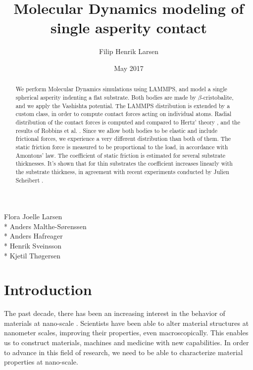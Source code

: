 \documentclass[twoside,english]{uiofysmaster}
\author{Filip Henrik Larsen}
\title{Molecular Dynamics modeling of single asperity contact}
\date{May 2017}
\begin{document}
\maketitle

\begin{abstract}
We perform Molecular Dynamics simulations using LAMMPS, and model a single spherical asperity indenting a flat substrate.
Both bodies are made by $\beta$-cristobalite, and we apply the Vashishta potential.
The LAMMPS distribution is extended by a custom class, in order to compute contact forces acting on individual atoms.  
Radial distribution of the contact forces is computed and compared to Hertz' theory \cite{Johnson1985}, and the results of Robbins et al. \cite{RobbinsSingleAsperity}. 
Since we allow both bodies to be elastic and include frictional forces, we experience a very different distribution than both of them. 
The static friction force is measured to be proportional to the load, in accordance with Amontons' law.
The coefficient of static friction is estimated for several substrate thicknesses. 
It's shown that for thin substrates the coefficient increases linearly with the substrate thickness, in agreement with recent experiments conducted by Julien Scheibert \cite{Scheibert2017}.




   
\end{abstract}


\begin{acknowledgements}
  Flora Joelle Larsen\\*
  Anders Malthe-Sørenssen \\*
  Anders Hafreager \\*
  Henrik Sveinsson \\*
  Kjetil Thøgersen
\end{acknowledgements}
{
\hypersetup{linkcolor = black}
\tableofcontents
}
\chapter{Introduction}

The past decade, there has been an increasing interest in the behavior of materials at nano-scale \cite{nanoOnReflection}.
Scientists have been able to alter material structures at nanometer scales, improving their properties, even macroscopically.
This enables us to construct materials, machines and medicine with new capabilities.   
In order to advance in this field of research, we need to be able to characterize material properties at nano-scale.
\end{document}
